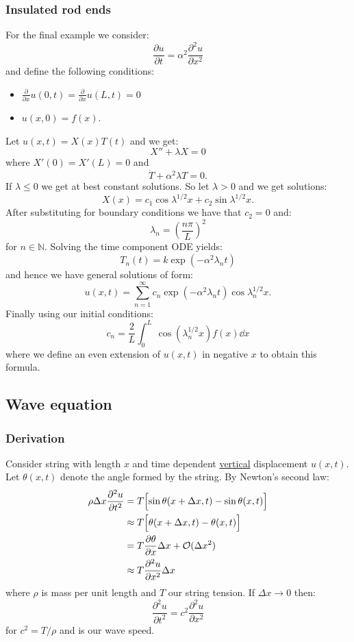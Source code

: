 \documentclass{article}
\begin{document}
\subsubsection{Insulated rod ends}
For the final example we consider:
$$\frac{\partial u}{\partial t}=\alpha^2\frac{\partial^2 u}{\partial x^2}$$
and define the following conditions:
\begin{itemize}
    \item $\displaystyle\frac{\partial}{\partial x}u(0,t)
    =\displaystyle\frac{\partial}{\partial x}u(L,t)=0$
    \item $u(x,0)=f(x)$.
\end{itemize}
Let $u(x,t)=X(x)T(t)$ and we get:
$$X''+\lambda X=0$$
where $X'(0)=X'(L)=0$ and
$$\dot{T}+\alpha^2\lambda T=0.$$
If $\lambda\leq0$ we get at best constant solutions.
So let $\lambda>0$ and we get solutions:
$$X(x)=c_1\cos\lambda^{1/2}x+c_2\sin\lambda^{1/2}x.$$
After substituting for boundary conditions we have that $c_2=0$ and:
$$\lambda_n=\left(\frac{n\pi}{L}\right)^2$$
for $n\in\mathbb{N}$. Solving the time component ODE yields:
$$T_n(t)=k\exp(-\alpha^2\lambda_n t)$$
and hence we have general solutions of form:
$$u(x,t)=\sum_{n=1}^{\infty}c_n\exp(-\alpha^2\lambda_n t)
\cos\lambda_n^{1/2}x.$$
Finally using our initial conditions:
$$c_n=\frac{2}{L}\int_{0}^{L}\
\cos(\lambda_n^{1/2}x) f(x)\dd x$$
where we define an even extension of $u(x,t)$ in negative $x$
to obtain this formula.

\newpage

\subsection{Wave equation}

\subsubsection{Derivation}
Consider string with length $x$ and
time dependent \underline{vertical} displacement $u(x,t)$.
Let $\theta(x,t)$ denote the angle formed by the string.
By Newton's second law:
\begin{align*}
    \rho\Delta x\frac{\partial^2u}{\partial t^2}
    &=T\Bigl[\sin\theta(x+\Delta x,t)
    -\sin\theta(x,t)\Bigr] \\
    &\approx T\Bigl[\theta(x+\Delta x,t)-\theta(x,t)\Bigr] \\
    &=T\frac{\partial\theta}{\partial x}\Delta x
    +\mathcal{O}(\Delta x^2) \\
    &\approx T\frac{\partial^2u}{\partial x^2}\Delta x
\end{align*}
where $\rho$ is mass per unit length and $T$ our string tension.
If $\Delta x\rightarrow0$ then:
$$\frac{\partial^2u}{\partial t^2}=c^2\frac{\partial^2u}{\partial x^2}$$
for $c^2=T/\rho$ and is our wave speed.
\end{document}
